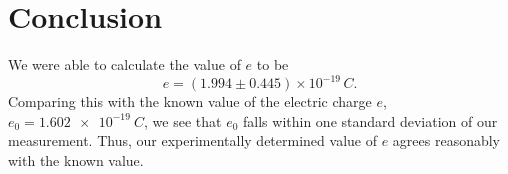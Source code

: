 \documentclass[aps, reprint,amsmath,amssymb]{revtex4-1} %
\begin{document}
\section{Conclusion}

We were able to calculate the value of $e$ to be
\[
    e = (1.994 \pm 0.445) \times 10^{-19} \,\si{C}.
\]
Comparing this with the known value of the electric charge $e$, $e_0 = \SI{1.602e-19}{C}$, we see that $e_0$ falls within one standard deviation of our measurement.
Thus, our experimentally determined value of $e$ agrees reasonably with the
known value.
\end{document}
